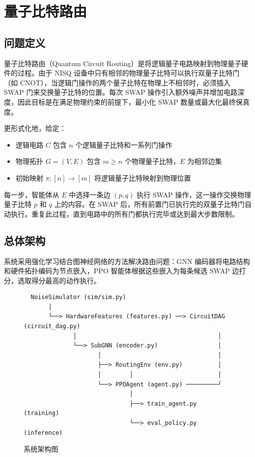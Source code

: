\newpage
\section{量子比特路由}

\subsection{问题定义}

量子比特路由（Quantum Circuit Routing）是将逻辑量子电路映射到物理量子硬件的过程。由于 NISQ 设备中只有相邻的物理量子比特可以执行双量子比特门（如 CNOT），当逻辑门操作的两个量子比特在物理上不相邻时，必须插入 SWAP 门来交换量子比特的位置。每次 SWAP 操作引入额外噪声并增加电路深度，因此目标是在满足物理约束的前提下，最小化 SWAP 数量或最大化最终保真度。

更形式化地，给定：
\begin{itemize}
  \item 逻辑电路 $C$ 包含 $n$ 个逻辑量子比特和一系列门操作
  \item 物理拓扑 $G = (V, E)$ 包含 $m \geq n$ 个物理量子比特，$E$ 为相邻边集
  \item 初始映射 $\pi: [n] \to [m]$ 将逻辑量子比特映射到物理位置
\end{itemize}

每一步，智能体从 $E$ 中选择一条边 $(p,q)$ 执行 SWAP 操作，这一操作交换物理量子比特 $p$ 和 $q$ 上的内容。在 SWAP 后，所有前置门已执行完的双量子比特门自动执行。重复此过程，直到电路中的所有门都执行完毕或达到最大步数限制。

\subsection{总体架构}

系统采用强化学习结合图神经网络的方法解决路由问题：GNN 编码器将电路结构和硬件拓扑编码为节点嵌入，PPO 智能体根据这些嵌入为每条候选 SWAP 边打分，选取得分最高的动作执行。

\begin{figure}[h]
\centering
\begin{verbatim}
  NoiseSimulator (sim/sim.py)
       │
       └──> HardwareFeatures (features.py) ──> CircuitDAG (circuit_dag.py)
              │                                        │
              └──> SubGNN (encoder.py)                 │
                     │                                 │
                     ├──> RoutingEnv (env.py)          │
                     │        │                        │
                     └──> PPOAgent (agent.py) ─────────┘
                              │
                              ├──> train_agent.py (training)
                              └──> eval_policy.py (inference)
\end{verbatim}
\caption{系统架构图}
\label{fig:arch}
\end{figure}

